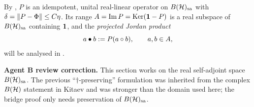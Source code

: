 By , $P$ is an idempotent, unital real-linear operator
on $B(\mathcal{H})_{\mathrm{sa}}$ with $\delta=\lVert P-\Phi \rVert\le C\eta$. Its range
$A=\operatorname{Im} P=\operatorname{Ker}(\mathbf{1}-P)$ is a real subspace of $B(\mathcal{H})_{\mathrm{sa}}$ containing $\mathbf{1}$, and the
\emph{projected Jordan product}
\begin{equation}\label{eq:projected-product}
  a\bullet b:=P(a\circ b),\qquad a,b\in A,
\end{equation}
will be analysed in .

\smallskip\noindent\textbf{Agent B review correction.}
This section works on the real self-adjoint space $B(\mathcal{H})_{\mathrm{sa}}$. The previous
``$\dagger$-preserving'' formulation was inherited from the complex
$B(\mathcal{H})$ statement in Kitaev and was stronger than the domain used here; the
bridge proof only needs preservation of $B(\mathcal{H})_{\mathrm{sa}}$.
